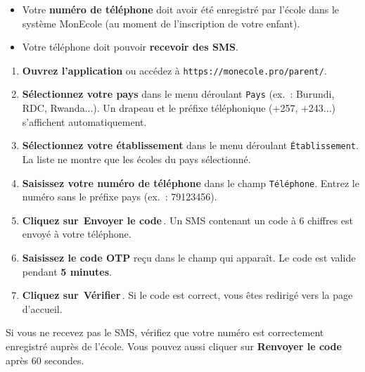 \documentclass[12pt,a4paper]{report}
\newcommand{\bouton}[1]{{\colorbox{emerald}{\small\sffamily\bfseries\color{white}\,#1\,}}}
\newcommand{\champ}[1]{\texttt{\color{violet}#1}}
\begin{document}
\begin{prerequis}
\begin{itemize}
  \item Votre \textbf{num\'ero de t\'el\'ephone} doit avoir \'et\'e enregistr\'e par l'\'ecole dans le syst\`eme MonEcole (au moment de l'inscription de votre enfant).
  \item Votre t\'el\'ephone doit pouvoir \textbf{recevoir des SMS}.
\end{itemize}
\end{prerequis}

\begin{etape}[title=Proc\'edure : Se connecter]
\begin{enumerate}[leftmargin=1.5cm,label=\textbf{\arabic*.},itemsep=12pt]
  \item \textbf{Ouvrez l'application} ou acc\'edez \`a \texttt{https://monecole.pro/parent/}.

  \item \textbf{S\'electionnez votre pays} dans le menu d\'eroulant \champ{Pays} (ex.~: Burundi, RDC, Rwanda...). Un drapeau et le pr\'efixe t\'el\'ephonique (+257, +243...) s'affichent automatiquement.

  \item \textbf{S\'electionnez votre \'etablissement} dans le menu d\'eroulant \champ{\'Etablissement}. La liste ne montre que les \'ecoles du pays s\'electionn\'e.

  \item \textbf{Saisissez votre num\'ero de t\'el\'ephone} dans le champ \champ{T\'el\'ephone}. Entrez le num\'ero sans le pr\'efixe pays (ex.~: 79123456).

  \item \textbf{Cliquez sur} \bouton{Envoyer le code}. Un SMS contenant un code \`a 6 chiffres est envoy\'e \`a votre t\'el\'ephone.

  \item \textbf{Saisissez le code OTP} re\c{c}u dans le champ qui appara\^it. Le code est valide pendant \textbf{5 minutes}.

  \item \textbf{Cliquez sur} \bouton{V\'erifier}. Si le code est correct, vous \^etes redirig\'e vers la page d'accueil.
\end{enumerate}
\end{etape}

\begin{attention}
Si vous ne recevez pas le SMS, v\'erifiez que votre num\'ero est correctement enregistr\'e aupr\`es de l'\'ecole. Vous pouvez aussi cliquer sur \textbf{Renvoyer le code} apr\`es 60 secondes.
\end{attention}
\end{document}
